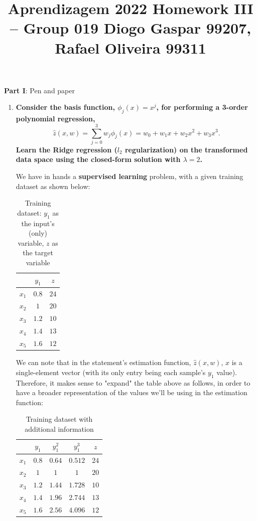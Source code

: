 \documentclass[12pt]{article}
\title{\large{Aprendizagem 2022}\vskip 0.2cm Homework III -- Group 019\vskip 0.2cm Diogo Gaspar 99207, Rafael Oliveira 99311}
\date{}
\begin{document}
\maketitle
\center\large{\vskip -2.5cm\textbf{Part I}: Pen and paper}
\begin{enumerate}[leftmargin=\labelsep]

  \item \textbf{Consider the basis function, $\phi_j(x) = x^j$, for performing a 3-order polynomial regression,
          $$
            \hat{z}(x, w) = \sum_{j=0}^3 w_j \phi_j(x) = w_0 + w_1 x + w_2 x^2 + w_3 x^3.
          $$
          Learn the Ridge regression ($l_2$ regularization) on the transformed data space
          using the closed-form solution with $\lambda = 2$.
        }

        We have in hands a \textbf{supervised learning} problem, with a given training
        dataset as shown below:

        \begin{table}[h]
          \centering
          \begin{tabular}{c|c|c}
                  & $y_1$ & $z$  \\ \hline
            $x_1$ & $0.8$ & $24$ \\
            $x_2$ & $1$   & $20$ \\
            $x_3$ & $1.2$ & $10$ \\
            $x_4$ & $1.4$ & $13$ \\
            $x_5$ & $1.6$ & $12$
          \end{tabular}
          \caption{Training dataset: $y_1$ as the input's (only) variable, $z$ as the target variable}
          \label{tab:training-dataset}
        \end{table}

        We can note that in the statement's estimation function, $\hat{z}(x, w)$, $x$ is a single-element vector
        (with its only entry being each sample's $y_1$ value). Therefore, it makes
        sense to "expand" the table above as follows, in order to have a broader
        representation of the values we'll be using in the estimation function:

        \begin{table}[h]
          \centering
          \begin{tabular}{c|ccc|c}
                  & $y_1$ & $y_1^2$ & $y_1^3$ & $z$  \\ \hline
            $x_1$ & $0.8$ & $0.64$  & $0.512$ & $24$ \\
            $x_2$ & $1$   & $1$     & $1$     & $20$ \\
            $x_3$ & $1.2$ & $1.44$  & $1.728$ & $10$ \\
            $x_4$ & $1.4$ & $1.96$  & $2.744$ & $13$ \\
            $x_5$ & $1.6$ & $2.56$  & $4.096$ & $12$
          \end{tabular}
          \caption{Training dataset with additional information}
          \label{tab:expanded-training-dataset}
        \end{table}


\end{enumerate}
\end{document}
